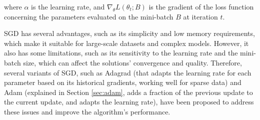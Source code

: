 where $\alpha$ is the learning rate, and $\nabla_{\theta} L(\theta_t; B)$ is the gradient of the loss function concerning the parameters evaluated on the mini-batch $B$ at iteration $t$.

\ac{SGD} has several advantages, such as its simplicity and low memory requirements, which make it suitable for large-scale datasets and complex models. However, it also has some limitations, such as its sensitivity to the learning rate and the mini-batch size, which can affect the solutions' convergence and quality. Therefore, several variants of \ac{SGD}, such as Adagrad (that adapts the learning rate for each parameter based on its historical gradients, working well for sparse data) and Adam (explained in Section \ref{sec:adam}, adds a fraction of the previous update to the current update, and adapts the learning rate), have been proposed to address these issues and improve the algorithm's performance.